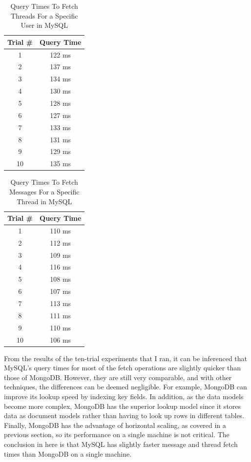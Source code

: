 \documentclass[12pt]{article}
\begin{document}
\begin{table}[h!]
\centering
\caption{Query Times To Fetch Threads For a Specific User in MySQL}
\vspace{2mm}
\begin{tabular}{|c|c|} 
 \hline
 Trial \# & Query Time \\ [0.5ex] 
 \hline\hline
 1 & 122 ms \\ 
 2 & 137 ms \\
 3 & 134 ms \\
 4 & 130 ms \\
 5 & 128 ms \\
 6 & 127 ms \\
 7 & 133 ms \\
 8 & 131 ms \\
 9 & 129 ms \\
 10 & 135 ms \\
 \hline
\end{tabular}
\end{table}

\begin{table}[h!]
\centering
\caption{Query Times To Fetch Messages For a Specific Thread in MySQL}
\vspace{2mm}
\begin{tabular}{|c|c|} 
 \hline
 Trial \# & Query Time \\ [0.5ex] 
 \hline\hline
 1 & 110 ms \\ 
 2 & 112 ms \\
 3 & 109 ms \\
 4 & 116 ms \\
 5 & 108 ms \\
 6 & 107 ms \\
 7 & 113 ms \\
 8 & 111 ms \\
 9 & 110 ms \\
 10 & 106 ms \\
 \hline
\end{tabular}
\end{table}

From the results of the ten-trial experiments that I ran, it can be inferenced that MySQL's query times for most of the fetch operations are slightly quicker than those of MongoDB. However, they are still very comparable, and with other techniques, the differences can be deemed negligible. For example, MongoDB can improve its lookup speed by indexing key fields. In addition, as the data models become more complex, MongoDB has the superior lookup model since it stores data as document models rather than having to look up rows in different tables. Finally, MongoDB has the advantage of horizontal scaling, as covered in a previous section, so its performance on a single machine is not critical. The conclusion in here is that MySQL has slightly faster message and thread fetch times than MongoDB on a single machine.
\end{document}
